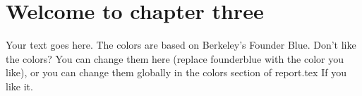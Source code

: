 \chapter{Welcome to chapter three}
\pagestyle{fancy}

\begin{tcolorbox}[breakable,title={An example colorbox},
colback=founderblue!5!white,
colframe=founderblue!75!black,
fonttitle=\headingfont\bfseries\large]
Your text goes here. The colors are based on Berkeley's Founder Blue.
Don't like the colors? You can change them here (replace founderblue with the color you like), or you can change them globally in the colors section of report.tex
If you like it.
\end{tcolorbox}






